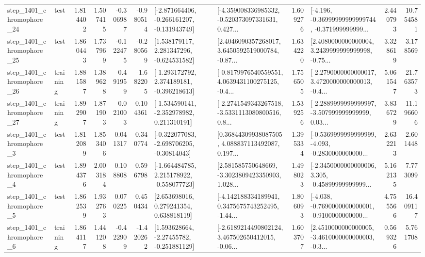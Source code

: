 \begin{tabular}{llrrrrllrlrr}
 step\_1401\_chromophore\_24 &      test &      1.814402 &    1.507415 &     -0.306987 & -0.980514 &  [-2.871664406, -0.266161207, -0.131943749] &  [-4.359008336985332, -0.520373097331631, 0.427... &       1.609276 &  [-4.196, -0.36999999999999744, -0.371999999999... &            2.440793 &         10.754581 \\
 step\_1401\_chromophore\_25 &      test &      1.860443 &    1.737969 &     -0.122475 & -0.280569 &    [1.538179117, 2.281347296, -0.624531582] &  [2.4046090357268017, 3.6450592519000784, -0.87... &       1.634220 &  [2.4080000000000004, 3.2439999999999998, -0.75... &            3.328619 &          3.178569 \\
 step\_1401\_chromophore\_26 &  training &      1.881587 &    1.389628 &     -0.491959 & -1.682205 &   [-1.293172792, 2.374189181, -0.396218613] &  [-0.8179976540559551, 4.0639431100275125, -0.4... &       1.756505 &  [-2.2790000000000017, 3.4720000000000013, -0.4... &            5.061547 &         21.763573 \\
 step\_1401\_chromophore\_27 &  training &      1.892907 &    1.871903 &     -0.021003 &  0.104361 &   [-1.534590141, -2.352978982, 0.211310191] &  [-2.2741549343267518, -3.5331113080800516, 0.8... &       1.539256 &  [-2.2889999999999997, -3.507999999999999, 0.03... &            3.836729 &         11.196606 \\
  step\_1401\_chromophore\_3 &      test &      1.812089 &    1.853406 &      0.041317 &  0.340774 &   [-0.322077083, -2.698706205, -0.30814043] &  [0.36844309938087505, 4.088837113492087, 0.197... &       1.395334 &  [-0.5369999999999999, -4.093, -0.2830000000000... &            2.632213 &          2.601448 \\
  step\_1401\_chromophore\_4 &      test &      1.894376 &    2.003184 &      0.108808 &  0.596798 &   [-1.664484785, 2.215178922, -0.558077723] &  [2.581585750648669, -3.3023809423350903, 1.028... &       1.498023 &  [-2.3450000000000006, 3.305, -0.45899999999999... &            5.162135 &          7.773099 \\
  step\_1401\_chromophore\_5 &      test &      1.862539 &    1.932763 &      0.070225 &  0.450434 &     [2.653698016, 0.279241354, 0.638818119] &  [-4.142188334189941, 0.3475675743252495, -1.44... &       1.806093 &  [-4.038, -0.7690000000000001, -0.9100000000000... &            4.755566 &         16.409117 \\
  step\_1401\_chromophore\_6 &  training &      1.864117 &    1.441208 &     -0.422909 & -1.420262 &    [1.593628664, -2.27455782, -0.251881129] &  [-2.6189214490802124, 3.467502650412015, -0.06... &       1.603707 &  [2.4510000000000005, -3.4610000000000003, -0.3... &            0.569326 &          5.761708 \\

\end{tabular}
